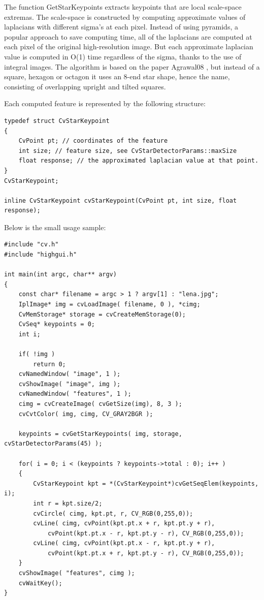 The function GetStarKeypoints extracts keypoints that are local
scale-space extremas. The scale-space is constructed by computing
approximate values of laplacians with different sigma's at each
pixel. Instead of using pyramids, a popular approach to save computing
time, all of the laplacians are computed at each pixel of the original
high-resolution image. But each approximate laplacian value is computed
in O(1) time regardless of the sigma, thanks to the use of integral
images. The algorithm is based on the paper 
Agrawal08
, but instead
of a square, hexagon or octagon it uses an 8-end star shape, hence the name,
consisting of overlapping upright and tilted squares.

Each computed feature is represented by the following structure:

\begin{lstlisting}
typedef struct CvStarKeypoint
{
    CvPoint pt; // coordinates of the feature
    int size; // feature size, see CvStarDetectorParams::maxSize
    float response; // the approximated laplacian value at that point.
}
CvStarKeypoint;

inline CvStarKeypoint cvStarKeypoint(CvPoint pt, int size, float response);
\end{lstlisting}

\ifC
Below is the small usage sample:

\begin{lstlisting}
#include "cv.h"
#include "highgui.h"

int main(int argc, char** argv)
{
    const char* filename = argc > 1 ? argv[1] : "lena.jpg";
    IplImage* img = cvLoadImage( filename, 0 ), *cimg;
    CvMemStorage* storage = cvCreateMemStorage(0);
    CvSeq* keypoints = 0;
    int i;

    if( !img )
        return 0;
    cvNamedWindow( "image", 1 );
    cvShowImage( "image", img );
    cvNamedWindow( "features", 1 );
    cimg = cvCreateImage( cvGetSize(img), 8, 3 );
    cvCvtColor( img, cimg, CV_GRAY2BGR );

    keypoints = cvGetStarKeypoints( img, storage, cvStarDetectorParams(45) );

    for( i = 0; i < (keypoints ? keypoints->total : 0); i++ )
    {
        CvStarKeypoint kpt = *(CvStarKeypoint*)cvGetSeqElem(keypoints, i);
        int r = kpt.size/2;
        cvCircle( cimg, kpt.pt, r, CV_RGB(0,255,0));
        cvLine( cimg, cvPoint(kpt.pt.x + r, kpt.pt.y + r),
            cvPoint(kpt.pt.x - r, kpt.pt.y - r), CV_RGB(0,255,0));
        cvLine( cimg, cvPoint(kpt.pt.x - r, kpt.pt.y + r),
            cvPoint(kpt.pt.x + r, kpt.pt.y - r), CV_RGB(0,255,0));
    }
    cvShowImage( "features", cimg );
    cvWaitKey();
}
\end{lstlisting}
\fi

